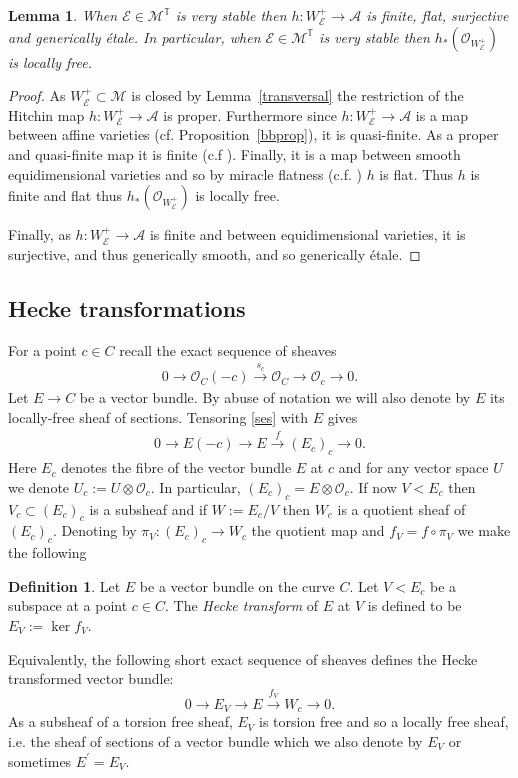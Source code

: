 \documentclass[12pt]{article}
\numberwithin{equation}{section}
\newtheorem{lemma}[theorem]{Lemma}
\theoremstyle{remark}
\theoremstyle{definition}
\newtheorem{definition}[theorem]{Definition}
\numberwithin{theorem}{section}
\def\beq{\begin{eqnarray}}
\def\eeq{\end{eqnarray}}
\def\calE{{\mathcal E}}
\def\M{{\mathcal{M}}}
\def\calA{{\mathcal{A}}}
\newcommand{\T}{{\mathbb{T}}}
\def\calO{{\mathcal O}}
\renewcommand{\1}{\mathbbm{1}}
\begin{document}
\begin{lemma} \label{locfree} When $\calE\in \M^{\T}$ is very stable then $h:W^+_\calE\to \calA$ is finite, flat, surjective and generically \'etale. In particular, when $\calE\in \M^{\T}$ is very stable then $h_*(\calO_{W^+_\calE})$ is locally free.
\end{lemma}
\begin{proof} As $W^+_\calE\subset \M$ is closed by Lemma~\ref{transversal} the restriction of the Hitchin map $h:W^+_\calE\to \calA$ is proper. Furthermore since $h:W^+_\calE\to \calA$ is a map between  affine varieties (cf. Proposition~\ref{bbprop}), it is quasi-finite. As a proper and quasi-finite map it is  finite (c.f \cite[Theorem 8.11.1]{ega}). Finally, it is a map between smooth equidimensional varieties and so by miracle flatness (c.f. \cite[Corollary 23.1]{matsumura}) $h$ is flat. Thus $h$ is  finite and flat  thus $h_*(\calO_{W^+_\calE})$ is locally free.
	
	Finally, as $h:W^+_\calE\to \calA$ is finite and between equidimensional varieties, it is surjective, and thus generically smooth, and so generically \'etale. 
\end{proof}

\subsection{ Hecke transformations}
\label{heckeverystable}

For a point $c\in C$ recall the exact sequence of sheaves \beq \label{ses}0\to \calO_C(-c)\stackrel{s_c}{\to} \calO_C\to \calO_c\to 0.\eeq  Let $E\to C$ be a vector bundle. By abuse of notation we will also denote by $E$ its locally-free sheaf of sections.   Tensoring \eqref{ses} with $E$ gives \beq\label{tensored} 0\to E(-c){\to} E\stackrel{f}{\to} (E_c)_c \to 0.\eeq Here $E_c$ denotes the fibre of the vector bundle $E$ at $c$ and for any vector space $U$ we denote $U_c:=U\otimes \calO_c.$ In particular, $(E_c)_c=E\otimes \calO_c$. If now $V<E_c$ then $V_c\subset (E_c)_c$ is a subsheaf and if $W:=E_c/V$ then $W_c$ is a quotient sheaf of $(E_c)_c$. Denoting by  $\pi_V:(E_c)_c\to W_c$ the quotient map and  $f_V=f \circ \pi_V$  we make the following 
\begin{definition} Let $E$ be a vector bundle on the curve $C$.  Let $V<E_c$ be a subspace at a point $c\in C$. The {\em Hecke transform} of $E$ at $V$ is defined to be $E_V:=\ker f_V$. \end{definition} Equivalently, the following   short exact sequence of sheaves defines the Hecke transformed vector bundle: $$0\to E_V{\to} E\stackrel{f_V}{\to} W_c \to 0.$$ As a subsheaf of a torsion free sheaf, $E_V$ is torsion free and so a locally free sheaf, i.e. the sheaf of sections of a vector bundle which we also denote by $E_V$ or sometimes $E^\prime=E_V$. 
\end{document}
